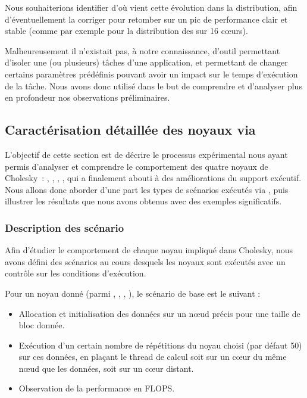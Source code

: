 Nous souhaiterions identifier d'où vient cette évolution dans la distribution, afin d'éventuellement la corriger pour retomber sur un pic de performance clair et stable (comme par exemple pour la distribution des \potrf sur 16 cœurs).

Malheureusement il n'existait pas, à notre connaissance, d'outil permettant d'isoler une (ou plusieurs) tâches d'une application, et permettant de changer certains paramètres prédéfinis pouvant avoir un impact sur le temps d'exécution de la tâche.
Nous avons donc utilisé \outil dans le but de comprendre et d'analyser plus en profondeur nos observations préliminaires.

\subsection{Caractérisation détaillée des noyaux via \outil}\label{sec:contribs:apps:cholesky:carton}

L'objectif de cette section est de décrire le processus expérimental nous ayant permis d'analyser et comprendre le comportement des quatre noyaux de Cholesky~: \potrf, \trsm, \syrk, \gemm, qui a finalement abouti à des améliorations du support exécutif.
Nous allons donc aborder d'une part les types de scénarios exécutés via \outil, puis illustrer les résultats que nous avons obtenus avec des exemples significatifs.

\subsubsection{Description des scénario}\label{sec:contribs:apps:cholesky:scenario}

Afin d'étudier le comportement de chaque noyau impliqué dans Cholesky, nous avons défini des scénarios au cours desquels les noyaux sont exécutés avec un contrôle sur les conditions d'exécution.

Pour un noyau donné (parmi \potrf, \trsm, \syrk, \gemm), le scénario de base est le suivant :
\begin{itemize}
  \item Allocation et initialisation des données sur un nœud précis pour une taille de bloc donnée.
  \item Exécution d'un certain nombre de répétitions du noyau choisi (par défaut 50) sur ces données, en plaçant le thread de calcul soit sur un cœur du même nœud que les données, soit sur un cœur distant.
  \item Observation de la performance en FLOPS.
\end{itemize}

